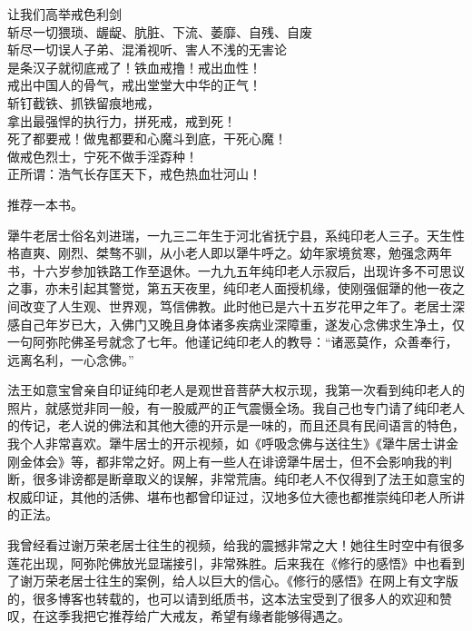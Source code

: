 \begin{adjustwidth}{-1em}{-1em}
\begin{poem}[抗撸战争]
\begin{multicols}{2}
            让我们高举戒色利剑 \\ 斩尽一切猥琐、龌龊、肮脏、下流、萎靡、自残、自废 \\ 斩尽一切误人子弟、混淆视听、害人不浅的无害论 \\ 是条汉子就彻底戒了！铁血戒撸！戒出血性！ \\ 戒出中国人的骨气，戒出堂堂大中华的正气！ \\ 斩钉截铁、抓铁留痕地戒， \\ 拿出最强悍的执行力，拼死戒，戒到死！ \\ 死了都要戒！做鬼都要和心魔斗到底，干死心魔！ \\ 做戒色烈士，宁死不做手淫孬种！ \\ 正所谓：浩气长存匡天下，戒色热血壮河山！
        \end{multicols}
    \end{poem}
\end{adjustwidth}

推荐一本书。

\begin{book}
    犟牛老居士俗名刘进瑞，一九三二年生于河北省抚宁县，系纯印老人三子。天生性格直爽、刚烈、桀骜不驯，从小老人即以犟牛呼之。幼年家境贫寒，勉强念两年书，十六岁参加铁路工作至退休。一九九五年纯印老人示寂后，出现许多不可思议之事，亦未引起其警觉，第五天夜里，纯印老人面授机缘，使刚强倔犟的他一夜之间改变了人生观、世界观，笃信佛教。此时他已是六十五岁花甲之年了。老居士深感自己年岁已大，入佛门又晚且身体诸多疾病业深障重，遂发心念佛求生净土，仅一句阿弥陀佛圣号就念了七年。他谨记纯印老人的教导：“诸恶莫作，众善奉行，远离名利，一心念佛。”

    法王如意宝曾亲自印证纯印老人是观世音菩萨大权示现，我第一次看到纯印老人的照片，就感觉非同一般，有一股威严的正气震慑全场。我自己也专门请了纯印老人的传记，老人说的佛法和其他大德的开示是一味的，而且还具有民间语言的特色，我个人非常喜欢。犟牛居士的开示视频，如《呼吸念佛与送往生》《犟牛居士讲金刚金体会》等，都非常之好。网上有一些人在诽谤犟牛居士，但不会影响我的判断，很多诽谤都是断章取义的误解，非常荒唐。纯印老人不仅得到了法王如意宝的权威印证，其他的活佛、堪布也都曾印证过，汉地多位大德也都推崇纯印老人所讲的正法。

    我曾经看过谢万荣老居士往生的视频，给我的震撼非常之大！她往生时空中有很多莲花出现，阿弥陀佛放光显瑞接引，非常殊胜。后来我在《修行的感悟》中也看到了谢万荣老居士往生的案例，给人以巨大的信心。《修行的感悟》在网上有文字版的，很多博客也转载的，也可以请到纸质书，这本法宝受到了很多人的欢迎和赞叹，在这季我把它推荐给广大戒友，希望有缘者能够得遇之。
\end{book}

